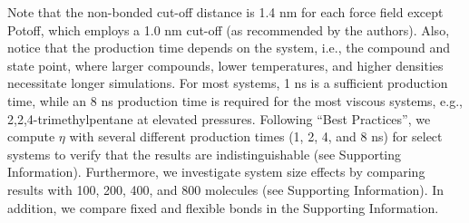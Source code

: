 \documentclass[preprint,review,12pt]{elsarticle}
\begin{document}
	Note that the non-bonded cut-off distance is 1.4 nm for each force field except Potoff, which employs a 1.0 nm cut-off (as recommended by the authors). Also, notice that the production time depends on the system, i.e., the compound and state point, where larger compounds, lower temperatures, and higher densities necessitate longer simulations. For most systems, 1 ns is a sufficient production time, while an 8 ns production time is required for the most viscous systems, e.g., 2,2,4-trimethylpentane at elevated pressures. Following ``Best Practices'', we compute $\eta$ with several different production times (1, 2, 4, and 8 ns) for select systems to verify that the results are indistinguishable (see Supporting Information). Furthermore, we investigate system size effects by comparing results with 100, 200, 400, and 800 molecules (see Supporting Information). In addition, we compare fixed and flexible bonds in the Supporting Information.
	
	
\end{document}
